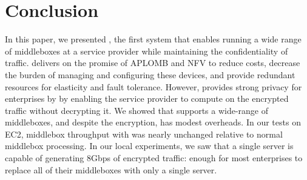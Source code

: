 
\section{Conclusion} \label{sec:concl}



In this paper, we presented \sys, the first system that enables running a wide range of middleboxes at a service provider 
while maintaining the confidentiality of traffic.
    \sys delivers on the promise of APLOMB and NFV to reduce costs, decrease the burden of managing and configuring these devices, and provide redundant resources for elasticity and fault tolerance.
    However, \sys provides strong privacy for enterprises by  by enabling the service provider to compute on the encrypted traffic without decrypting it. 
We showed that \sys supports a wide-range of middleboxes, and despite the encryption, \sys has modest overheads. In our tests on EC2, middlebox throughput with \sys was nearly unchanged relative to normal middlebox processing. In our local experiments, we saw that a single server is capable of generating 8Gbps of encrypted traffic: enough for most enterprises to replace all of their middleboxes with only a single server.
